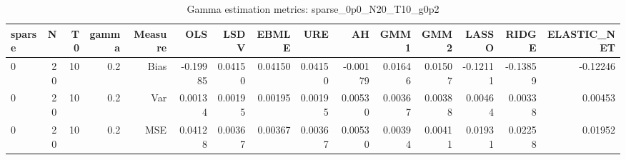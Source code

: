 \begin{table}[!htbp]\centering
\caption{Gamma estimation metrics: sparse_0p0_N20_T10_g0p2}
\label{tab:table1_sparse_0p0_N20_T10_g0p2}
\begin{tabular}{lrrrrrrrrrrrrrr}
\hline
sparse & N & T0 & gamma & Measure & OLS & LSDV & EBMLE & URE & AH & GMM1 & GMM2 & LASSO & RIDGE & ELASTIC_NET \\
\hline
0 & 20 & 10 & 0.2 & Bias & -0.19985 & 0.04150 & 0.04150 & 0.04150 & -0.00179 & 0.01646 & 0.01507 & -0.12111 & -0.13859 & -0.12246 \\
0 & 20 & 10 & 0.2 & Var & 0.00134 & 0.00195 & 0.00195 & 0.00195 & 0.00530 & 0.00367 & 0.00388 & 0.00464 & 0.00338 & 0.00453 \\
0 & 20 & 10 & 0.2 & MSE & 0.04128 & 0.00367 & 0.00367 & 0.00367 & 0.00530 & 0.00394 & 0.00411 & 0.01931 & 0.02258 & 0.01952 \\
\hline
\end{tabular}
\end{table}

